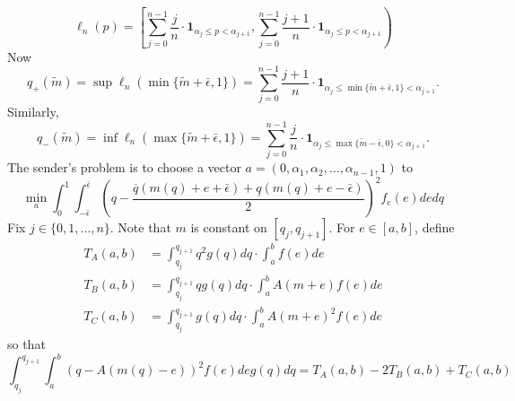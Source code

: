 \documentclass[12pt]{article}
\begin{document}
\begin{equation}
\ell_{n}(p)=\left[\sum_{j=0}^{n-1}{\frac{j}{n}\cdot\mathbf{1}_{\alpha_{j}\leq p<\alpha_{j+1}}},\sum_{j=0}^{n-1}{\frac{j+1}{n}\cdot\mathbf{1}_{\alpha_{j}\leq p<\alpha_{j+1}}}\right)
\end{equation}
Now
\begin{equation}
q_{+}(\tilde{m})=\sup\ell_{n}(\min\{\tilde{m}+\bar{\epsilon},1\})=\sum_{j=0}^{n-1}{\frac{j+1}{n}\cdot\mathbf{1}_{\alpha_{j}\leq\min\{\tilde{m}+\bar{\epsilon},1\}<\alpha_{j+1}}}.
\end{equation}
Similarly,
\begin{equation}
q_{-}(\tilde{m})=\inf\ell_{n}(\max\{\tilde{m}+\bar{\epsilon},1\})=\sum_{j=0}^{n-1}{\frac{j}{n}\cdot\mathbf{1}_{\alpha_{j}\leq\max\{\tilde{m}-\bar{\epsilon},0\}<\alpha_{j+1}}}.
\end{equation}
The sender's problem is to choose a vector $a=(0,\alpha_{1},\alpha_{2},\ldots,\alpha_{n-1},1)$ to
\begin{equation}
\min_{a}\int_{0}^{1}{\int_{-\bar{\epsilon}}^{\bar{\epsilon}}{\left(q-\frac{\overline{q}(m(q)+e+\bar{\epsilon})+\underline{q}(m(q)+e-\bar{\epsilon})}{2}\right)^{2}f_{e}(e)de}dq}
\end{equation}
Fix $j\in\{0,1,\ldots,n\}$. Note that $m$ is constant on $[q_{j},q_{j+1}]$. For $e\in[a,b]$, define
\begin{align}
T_{A}(a,b)&=\int_{q_{j}}^{q_{j+1}}{q^{2}g(q)dq}\cdot\int_{a}^{b}{f(e)de}\\
T_{B}(a,b)&=\int_{q_{j}}^{q_{j+1}}{qg(q)dq}\cdot\int_{a}^{b}{A(m+e)f(e)de}\\
T_{C}(a,b)&=\int_{q_{j}}^{q_{j+1}}{g(q)dq}\cdot\int_{a}^{b}{A(m+e)^{2}f(e)de}
\end{align} 
so that
\begin{equation}
\int_{q_{j}}^{q_{j+1}}{\int_{a}^{b}{(q-A(m(q)-e))^{2}f(e)de}g(q)dq}=T_{A}(a,b)-2T_{B}(a,b)+T_{C}(a,b)
\end{equation}
\end{document}
